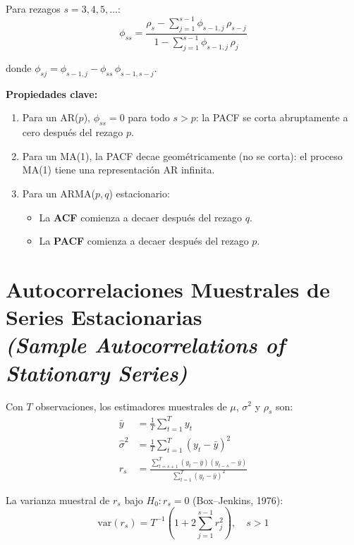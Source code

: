 \documentclass[12pt]{article}
\begin{document}
Para rezagos $s = 3, 4, 5, \ldots$:
\begin{equation}
\phi_{ss}
  = \frac{\displaystyle\rho_s - \sum_{j=1}^{s-1}\phi_{s-1,j}\,\rho_{s-j}}
         {\displaystyle 1 - \sum_{j=1}^{s-1}\phi_{s-1,j}\,\rho_j}
\end{equation}

donde $\phi_{sj} = \phi_{s-1,j} - \phi_{ss}\,\phi_{s-1,s-j}$.

\textbf{Propiedades clave:}
\begin{enumerate}
  \item Para un AR($p$), $\phi_{ss} = 0$ para todo $s > p$: la PACF se corta abruptamente a cero despu\'es del rezago $p$.
  \item Para un MA(1), la PACF decae geom\'etricamente (no se corta): el proceso MA(1) tiene una representaci\'on AR infinita.
  \item Para un ARMA($p,q$) estacionario:
    \begin{itemize}
      \item La \textbf{ACF} comienza a decaer despu\'es del rezago $q$.
      \item La \textbf{PACF} comienza a decaer despu\'es del rezago $p$.
    \end{itemize}
\end{enumerate}

\section{Autocorrelaciones Muestrales de Series Estacionarias\\
\textit{(Sample Autocorrelations of Stationary Series)}}

Con $T$ observaciones, los estimadores muestrales de $\mu$, $\sigma^2$ y $\rho_s$ son:
\begin{align}
\bar{y}      &= \frac{1}{T}\sum_{t=1}^{T} y_t \\
\hat{\sigma}^2 &= \frac{1}{T}\sum_{t=1}^{T}(y_t-\bar{y})^2 \\
r_s &= \frac{\displaystyle\sum_{t=s+1}^{T}(y_t-\bar{y})(y_{t-s}-\bar{y})}
             {\displaystyle\sum_{t=1}^{T}(y_t-\bar{y})^2}
\end{align}

La varianza muestral de $r_s$ bajo $H_0: r_s = 0$ (Box--Jenkins, 1976):
\begin{equation}
\text{var}(r_s)
  = T^{-1}\!\left(1 + 2\sum_{j=1}^{s-1} r_j^2\right), \quad s > 1
\end{equation}
\end{document}
